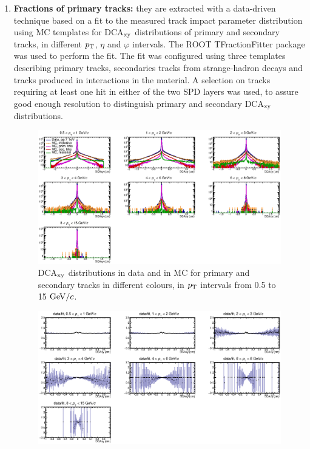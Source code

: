 \begin{enumerate}
\item {\bf Fractions of primary tracks:} they are extracted with a data-driven technique based on a fit to
 the measured track impact parameter distribution using MC templates for 
 DCA$_{\rm xy}$ distributions of primary and secondary tracks, in different
 $p_{\rm T}$, $\eta$ and $\varphi$ intervals. The ROOT TFractionFitter 
 package was used to perform the fit. The fit was configured 
 using three templates describing primary tracks, secondaries tracks
 from strange-hadron decays and tracks produced in interactions in the material. 
 A selection on tracks requiring at least one hit in either of the two SPD layers 
 was used, to assure good enough resolution to distinguish primary and 
 secondary DCA$_{\rm xy}$ distributions.
\begin{figure}[!htb]
\begin{center}
\includegraphics[width=1.2\textwidth]{FigCap4/FitComponents.eps}
\caption{DCA$_{\rm xy}$ distributions in data and in MC for primary and secondary tracks in different colours, in $p_{\rm T}$ intervals from 0.5 to 15 $\mathrm{GeV}/c$.}
\label{fig:DCAxyDataMCVsPt}
\end{center}
\end{figure}
\begin{figure}[!hb]
\begin{center}
\includegraphics[width=1.2\textwidth]{FigCap4/DataOverFit.eps}

\end{center}
\end{figure}
\end{enumerate}
